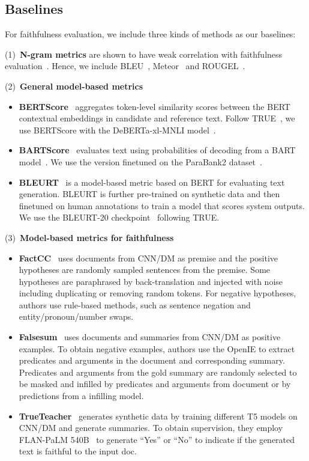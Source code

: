 \subsection{Baselines}
For faithfulness evaluation, we include three kinds of methods as our baselines:

(1)~\textbf{N-gram metrics} are shown to have weak correlation with faithfulness evaluation~\cite{maynez-etal-2020-faithfulness, honovich-etal-2021-q2}. Hence, we include BLEU~\cite{bleu}, Meteor~\cite{banerjee-lavie-2005-meteor} and ROUGEL~\cite{rouge}.

(2)~\textbf{General model-based metrics}
\begin{itemize}[nosep,leftmargin=*]
    \item \textbf{BERTScore}~\cite{Zhang2019BERTScoreET} aggregates token-level similarity scores between the BERT~\cite{Devlin2019BERTPO} contextual embeddings in candidate and reference text. Follow TRUE~\cite{Honovich2022TRUERF}, we use BERTScore with the DeBERTa-xl-MNLI model~\cite{He2020DeBERTaDB, nangia-etal-2017-repeval}.
    \item \textbf{BARTScore}~\cite{Yuan2021BARTScoreEG} evaluates text using probabilities of decoding from a BART model~\cite{lewis-etal-2020-bart}. We use the version finetuned on the ParaBank2 dataset~\cite{hu-etal-2019-large}.
    \item \textbf{BLEURT}~\cite{sellam-etal-2020-bleurt} is a model-based metric based on BERT for evaluating text generation. BLEURT is further pre-trained on synthetic data and then finetuned on human annotations to train a model that scores system outputs. We use the BLEURT-20 checkpoint~\cite{pu-etal-2021-learning} following TRUE.
\end{itemize}

(3)~\textbf{Model-based metrics for faithfulness}
\begin{itemize}[nosep,leftmargin=*]
    \item \textbf{FactCC}~\cite{kryscinski-etal-2020-evaluating} uses documents from CNN/DM as premise and the positive hypotheses are randomly sampled sentences from the premise. Some hypotheses are paraphrased by back-translation and injected with noise including duplicating or removing random tokens. For negative hypotheses, authors use rule-based methods, such as sentence negation and entity/pronoun/number swaps.
    \item \textbf{Falsesum}~\cite{Utama2022FalsesumGD} uses documents and summaries from CNN/DM as positive examples. To obtain negative examples, authors use the OpenIE to extract predicates and arguments in the document and corresponding summary. Predicates and arguments from the gold summary are randomly selected to be masked and infilled by predicates and arguments from document or by predictions from a infilling model.
    \item \textbf{TrueTeacher}~\cite{Gekhman2023TrueTeacherLF} generates synthetic data by training different T5 models on CNN/DM and generate summaries. To obtain supervision, they employ FLAN-PaLM 540B~\cite{Chung2022ScalingIL} to generate ``Yes'' or ``No'' to indicate if the generated text is faithful to the input doc.
\end{itemize}

